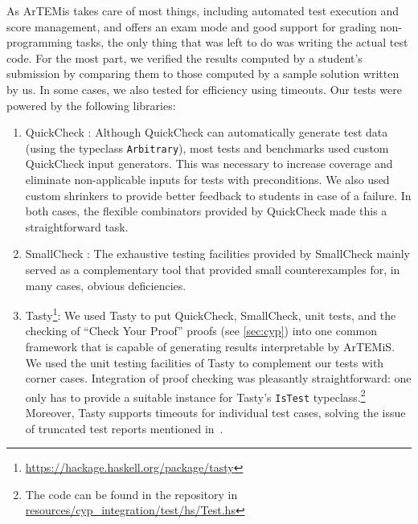 As ArTEMis takes care of most things,
including automated test execution and score management,
and offers an exam mode and good support for grading non-programming tasks,
the only thing that was left to do was writing the actual test code.
For the most part, we verified the results computed
by a student's submission by comparing them to those
computed by a sample solution written by us.
In some cases, we also tested for efficiency using timeouts.
Our tests were powered by the following libraries:
\begin{enumerate}
  \item QuickCheck \cite{quickcheck}:
  Although QuickCheck can automatically generate test data (using the typeclass \lstinline!Arbitrary!),
  most tests and benchmarks used custom QuickCheck input generators.
  This was necessary to increase coverage and eliminate non-applicable inputs for tests with preconditions.
  We also used custom shrinkers to provide better feedback to students in case of a failure.
  In both cases, the flexible combinators provided by QuickCheck made this a straightforward task.
  \item SmallCheck \cite{smallcheck}: The exhaustive testing facilities provided by SmallCheck mainly served
    as a complementary tool that provided small counterexamples for, in many cases, obvious deficiencies.
  \item Tasty\footnote{\url{https://hackage.haskell.org/package/tasty}}: We used Tasty to put QuickCheck, SmallCheck, unit tests, and the checking of ``Check Your Proof'' proofs (see \cref{sec:cyp}) into one common framework that is capable of generating results interpretable by ArTEMiS.
  We used the unit testing facilities of Tasty to complement our tests with corner cases.
  Integration of proof checking was pleasantly straightforward:
  one only has to provide a suitable instance for Tasty's \texttt{IsTest} typeclass.\footnote{The code can be found in the repository in \href{https://github.com/kappelmann/engaging-large-scale-functional-programming/tree/main/resources/io_mocking/typeclass}{resources/cyp\_integration/test/hs/Test.hs}}
  Moreover, Tasty supports timeouts for individual test cases,
  solving the issue of truncated test reports mentioned in~\cite{next_1100}.
\end{enumerate}

